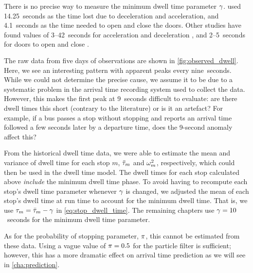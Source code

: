 There is no precise way to measure the minimum dwell time parameter $\gamma$. \citet{Hans_2015} used 14.25~seconds as the time lost due to deceleration and acceleration, and 4.1~seconds as the time needed to open and close the doors. Other studies have found values of 3--42~seconds for acceleration and deceleration \citep{Robinson_2013}, and 2--5~seconds for doors to open and close \citep{Meng_2013}.



The raw data from five days of observations are shown in \cref{fig:observed_dwell}. Here, we see an interesting pattern with apparent peaks every nine~seconds. While we could not determine the precise cause, we assume it to be due to a systematic problem in the arrival time recording system used to collect the data. However, this makes the first peak at 9~seconds difficult to evaluate: are there dwell times this short (contrary to the literature) or is it an artefact? For example, if a bus passes a stop without stopping and reports an arrival time followed a few seconds later by a departure time, does the 9-second anomaly affect this?

From the historical dwell time data, we were able to estimate the mean and variance of dwell time for each stop $m$, $\bar{\tau}_m$ and $\omega^2_m$, respectively, which could then be used in the dwell time model. The dwell times for each stop calculated above \emph{include} the minimum dwell time phase. To avoid having to recompute each stop's dwell time parameter whenever $\gamma$ is changed, we adjusted the mean of each stop's dwell time at run time to account for the minimum dwell time. That is, we use $\tau_m = \bar{\tau}_m - \gamma$ in \cref{eq:stop_dwell_time}. The remaining chapters use $\gamma = 10$~seconds for the minimum dwell time parameter.

As for the probability of stopping parameter, $\pi$, this cannot be estimated from these data. Using a vague value of $\pi=0.5$ for the particle filter is sufficient; however, this has a more dramatic effect on arrival time prediction as we will see in \cref{cha:prediction}.
